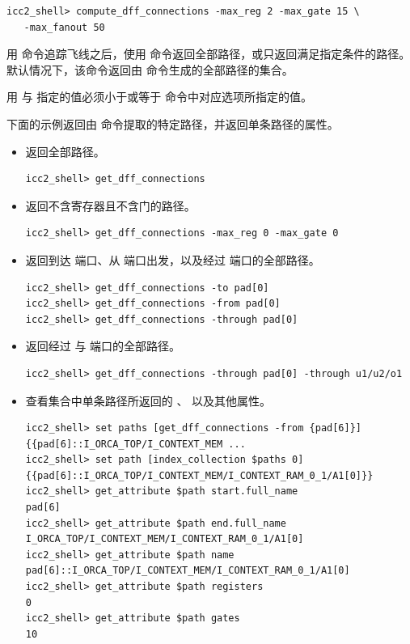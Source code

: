 \begin{lstlisting}
icc2_shell> compute_dff_connections -max_reg 2 -max_gate 15 \
   -max_fanout 50
\end{lstlisting}

用  命令追踪飞线之后，使用  命令返回全部路径，或只返回满足指定条件的路径。默认情况下，该命令返回由  命令生成的全部路径的集合。

\begin{noteBox}
用  与  指定的值必须小于或等于  命令中对应选项所指定的值。
\end{noteBox}

下面的示例返回由  命令提取的特定路径，并返回单条路径的属性。

\begin{itemize}
  \item 返回全部路径。
\begin{lstlisting}
icc2_shell> get_dff_connections
\end{lstlisting}
  \item 返回不含寄存器且不含门的路径。
\begin{lstlisting}
icc2_shell> get_dff_connections -max_reg 0 -max_gate 0
\end{lstlisting}
  \item 返回到达  端口、从  端口出发，以及经过  端口的全部路径。
\begin{lstlisting}
icc2_shell> get_dff_connections -to pad[0]
icc2_shell> get_dff_connections -from pad[0]
icc2_shell> get_dff_connections -through pad[0]
\end{lstlisting}
  \item 返回经过  与  端口的全部路径。
\begin{lstlisting}
icc2_shell> get_dff_connections -through pad[0] -through u1/u2/o1
\end{lstlisting}
  \item 查看集合中单条路径所返回的 、 以及其他属性。
\begin{lstlisting}
icc2_shell> set paths [get_dff_connections -from {pad[6]}]
{{pad[6]::I_ORCA_TOP/I_CONTEXT_MEM ...
icc2_shell> set path [index_collection $paths 0]
{{pad[6]::I_ORCA_TOP/I_CONTEXT_MEM/I_CONTEXT_RAM_0_1/A1[0]}}
icc2_shell> get_attribute $path start.full_name
pad[6]
icc2_shell> get_attribute $path end.full_name
I_ORCA_TOP/I_CONTEXT_MEM/I_CONTEXT_RAM_0_1/A1[0]
icc2_shell> get_attribute $path name
pad[6]::I_ORCA_TOP/I_CONTEXT_MEM/I_CONTEXT_RAM_0_1/A1[0]
icc2_shell> get_attribute $path registers
0
icc2_shell> get_attribute $path gates
10
\end{lstlisting}
\end{itemize}

